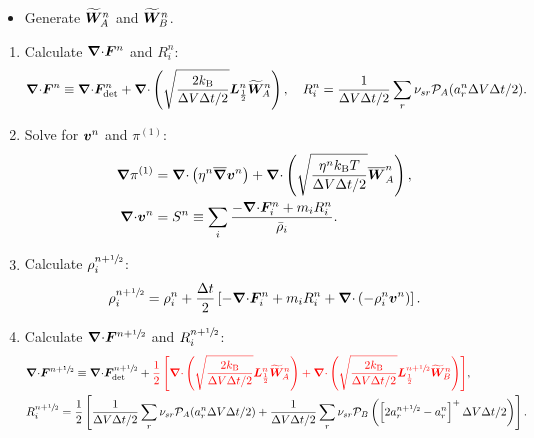 \documentclass[
10pt
showpacs, showkeys,
amsmath,amssymb,
aps,
pre,
floatfix,
]{revtex4-1}
\newcommand{\divg}{{\V\nabla\cdot}}                       %
\newcommand{\paren}[1]{{(#1)}}                            %
\begin{document}
\begin{itemize}
\item Generate $\widetilde{\boldsymbol{W}}^n_A$ and $\widetilde{\boldsymbol{W}}^n_B$.
\end{itemize}

\begin{enumerate}

\item Calculate $\divg\V{F}^n$ and $R^n_i$:
\begin{equation}
\divg\V{F}^n \equiv \divg\V{F}^n_\mathrm{det} + \divg\left( \sqrt{ \frac{2k_\mathrm{B}}{\D{V}\D{t}/2} } \V{L}^n_{\frac12} \widetilde{\V{W}}^n_A \right),
\quad R^n_i = \frac{1}{\D{V}\D{t}/2} \sum_r \nu_{sr} \mathcal{P}_A(a^n_r\D{V}\D{t}/2).
\end{equation}

\item Solve for $\boldsymbol{v}^n$ and $\pi^\paren{1}$:
\begin{align}
\label{overdamped_stokes_v_1st}
\grad\pi^\paren{1} & = \divg\left( \eta^n \overline{\grad}\V{v}^n \right)
+ \divg\left( \sqrt{\frac{\eta^n k_\mathrm{B}T}{\D{V}\D{t}/2}} \overline{\V{W}}^n_A \right),
\\
\label{overdamped_stokes_p_1st}
\divg\V{v}^n & = S^n\equiv \sum_i \frac{-\divg\V{F}^n_i + m_i R^n_i }{\bar{\rho}_i}.
\end{align}

\item Calculate $\rho^{n+\sfrac{1}{2}}_i$:
\begin{equation}
\rho^{n+\myhalf}_i = \rho^n_i + \frac{\D{t}}{2} \left[ -\divg\V{F}^n_i + m_i R^n_i + \divg\left( -\rho^n_i \V{v}^n \right) \right].
\end{equation}

\item Calculate $\divg\V{F}^{n+\myhalf}$ and $R^{n+\sfrac{1}{2}}_i$:
\begin{align}
&\divg\V{F}^{n+\myhalf} \equiv \divg\V{F}_\mathrm{det}^{n+\myhalf} +
{\color{red}
\frac{1}{2}\left[ 
\divg\left( \sqrt{ \frac{2k_\mathrm{B}}{\D{V}\D{t}/2} } \V{L}^n_{\frac12} \widetilde{\V{W}}^n_A \right) 
+\divg\left( \sqrt{ \frac{2k_\mathrm{B}}{\D{V}\D{t}/2} } \V{L}^{n+\myhalf}_{\frac12} \widetilde{\V{W}}^n_B \right) 
\right]},\\
&R^{n+\myhalf}_i = \frac{1}{2}\left[ \frac{1}{\D{V}\D{t}/2} \sum_r \nu_{sr} \mathcal{P}_A(a^n_r\D{V}\D{t}/2) + \frac{1}{\D{V}\D{t}/2} \sum_r \nu_{sr} \mathcal{P}_B\left( \left[ 2 a^{n+\myhalf}_r - a^n_r \right]^+ \D{V}\D{t}/2 \right) \right].
\end{align}


\end{enumerate}
\end{document}
